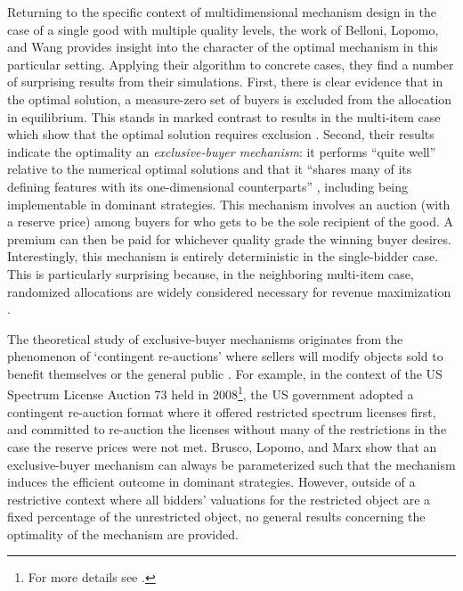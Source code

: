 \documentclass{article}
\begin{document}
Returning to the specific context of multidimensional mechanism design in the case of a single good with multiple quality levels, the work of Belloni, Lopomo, and Wang \autocite*{belloni2010multidimensional} provides insight into the character of the optimal mechanism in this particular setting. Applying their algorithm to concrete cases, they find a number of surprising results from their simulations. First, there is clear evidence that in the optimal solution, a measure-zero set of buyers is excluded from the allocation in equilibrium. This stands in marked contrast to results in the multi-item case which show that the optimal solution requires exclusion \autocite{rochet1998ironing, armstrong1996multiproduct}. Second, their results indicate the optimality an \textit{exclusive-buyer mechanism}: it performs ``quite well'' relative to the numerical optimal solutions and that it ``shares many of its defining features with its one-dimensional counterparts'' \autocite[p1085-6]{belloni2010multidimensional}, including being implementable in dominant strategies. This mechanism involves an auction (with a reserve price) among buyers for who gets to be the sole recipient of the good. A premium can then be paid for whichever quality grade the winning buyer desires. Interestingly, this mechanism is entirely deterministic in the single-bidder case.  This is particularly surprising because, in the neighboring multi-item case, randomized allocations are widely considered necessary for revenue maximization \autocite{daskalakis2015multi}.

The theoretical study of exclusive-buyer mechanisms originates from the phenomenon of `contingent re-auctions' where sellers will modify objects sold to benefit themselves or the general public \autocite{brusco2011}. For example, in the context of the US Spectrum License Auction 73 held in 2008\footnote{For more details see \autocite{brusco2009google}.}, the US government adopted a contingent re-auction format where it offered restricted spectrum licenses first, and committed to re-auction the licenses without many of the restrictions in the case the reserve prices were not met. Brusco, Lopomo, and Marx \autocite*{brusco2011} show that an exclusive-buyer mechanism can always be parameterized such that the mechanism induces the efficient outcome in dominant strategies. However, outside of a restrictive context where all bidders' valuations for the restricted object are a fixed percentage of the unrestricted object, no general results concerning the optimality of the mechanism are provided.
\end{document}
